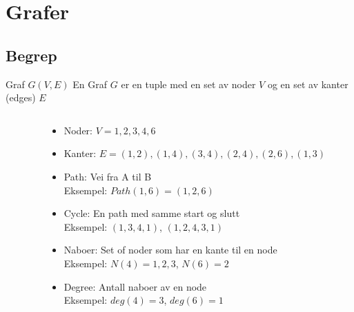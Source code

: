 \section{Grafer}
\subsection*{Begrep}
\begin{frame}
    \begin{block}{Graf $G(V,E)$}
    En Graf $G$ er en tuple med en set av noder $V$ og en set av kanter (edges) $E$
    \end{block}

\begin{columns}
    \begin{column}{0.28\textwidth}
 \end{column}
    \begin{column}{0.68\textwidth}
\begin{itemize}
    \item<1-> Noder: $V={1,2,3,4,6}$
    \item<2-> Kanter: $E={(1,2), (1,4), (3,4), (2,4), (2,6), (1,3)}$
    \item<3-> Path: Vei fra A til B\\
    Eksempel: $Path(1,6)=(1,2,6)$
    \item<4-> Cycle: En path med samme start og slutt\\
    Eksempel: $(1,3,4,1)$, $(1,2,4,3,1)$
    \item<5-> Naboer: Set of noder som har en kante til en node\\
    Eksempel: $N(4)={1,2,3}$, $N(6)=2$
    \item<6-> Degree: Antall naboer av en node\\
    Eksempel: $deg(4)=3$, $deg(6)=1$
\end{itemize}
 \end{column}
\end{columns}
\end{frame}

